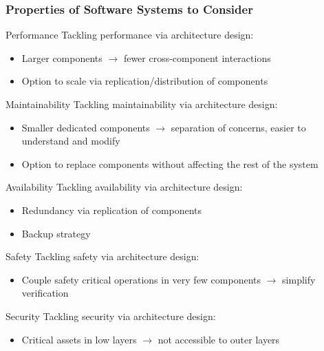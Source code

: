 \begin{frame}
	\frametitle{Properties of Software Systems to Consider \mytitlesource{\sommerville}}
	\begin{fancycolumns}[widths={50,50}]
		\begin{definition}{Performance}
			Tackling performance via architecture design:
			\begin{itemize}
				\item Larger components $\rightarrow$ fewer cross-component interactions
				\item Option to scale via replication/distribution of components
			\end{itemize}
		\end{definition}
		\begin{definition}{Maintainability}
			Tackling maintainability via architecture design:
			\begin{itemize}
				\item Smaller dedicated components $\rightarrow$ separation of concerns, easier to understand and modify
				\item Option to replace components without affecting the rest of the system
			\end{itemize}
		\end{definition}
		\nextcolumn
		\begin{definition}{Availability}
			Tackling availability via architecture design:
			\begin{itemize}
				\item Redundancy via replication of components
				\item Backup strategy
			\end{itemize}
		\end{definition}
		\begin{definition}{Safety}
			Tackling safety via architecture design:
			\begin{itemize}
				\item Couple safety critical operations in very few components $\rightarrow$ simplify verification
			\end{itemize}
		\end{definition}
		\begin{definition}{Security}
			Tackling security via architecture design:
			\begin{itemize}
				\item Critical assets in low layers $\rightarrow$ not accessible to outer layers
			\end{itemize}
		\end{definition}

	\end{fancycolumns}


\end{frame}

